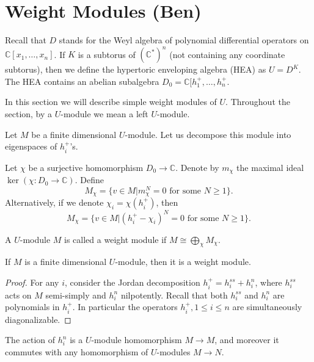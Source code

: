 \newpage

\section{Weight Modules (Ben)}

Recall that $D$ stands for the Weyl algebra of polynomial differential operators on $\mathbb{C}[x_1,\dots,x_n]$. If $K$ is a subtorus of $(\mathbb{C^*})^n$ (not containing any coordinate subtorus), then we define the hypertoric enveloping algebra (HEA) as $U=D^K$. The HEA contains an abelian subalgebra $D_0=\mathbb{C}[h_1^+,\dots,h_n^+$.

In this section we will describe simple weight modules of $U$. Throughout the section, by a $U$-module we mean a left $U$-module.

Let $M$ be a finite dimensional $U$-module. Let us decompose this module into eigenspaces of $h_i^+$'s.

\begin{definition}
Let $\chi$ be a surjective homomorphism $D_0\to \mathbb{C}$. Denote by $m_\chi$ the maximal ideal $\ker(\chi:D_0\to \mathbb{C})$. Define
$$
M_\chi = \{v\in M | m_\chi^N=0 \textrm{ for some } N\ge1\}.
$$
Alternatively, if we denote $\chi_i=\chi(h_i^+)$, then
$$
M_\chi = \{v\in M | (h_i^+-\chi_i)^N=0 \textrm{ for some } N\ge1\}.
$$
\end{definition}
\begin{definition}
A $U$-module $M$ is called a weight module if $\displaystyle M\cong \bigoplus_{\chi}M_\chi$.
\end{definition}


\begin{theorem}
If $M$ is a finite dimensional $U$-module, then it is a weight module.
\end{theorem}

\begin{proof}
For any $i$, consider the Jordan decomposition $h_i^+=h_i^{ss}+h_i^{n}$, where $h_i^{ss}$ acts on $M$ semi-simply and $h_i^n$ nilpotently. Recall that both $h_i^{ss}$ and $h_i^n$ are polynomials in $h_i^+$. In particular the operators $h_i^+, 1\le i\le n$ are simultaneously diagonalizable.
\end{proof}

\begin{remark}
The action of $h_i^n$ is a $U$-module homomorphism $M\to M$, and moreover it commutes with any homomorphism of $U$-modules $M\to N$.
\end{remark}

